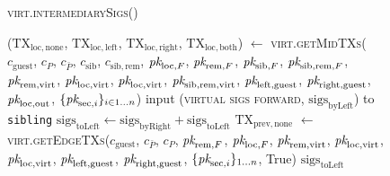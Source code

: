 \begin{figure}[H]
  \begin{processbox}{\textsc{virt.intermediarySigs}()}
    \begin{algorithmic}[1]
      \State ($\mathrm{TX}_{\mathrm{loc}, \mathrm{none}}$,
      $\mathrm{TX}_{\mathrm{loc}, \mathrm{left}}$, $\mathrm{TX}_{\mathrm{loc},
      \mathrm{right}}$, $\mathrm{TX}_{\mathrm{loc}, \mathrm{both}}$) $\gets$
      \textsc{virt.getMidTXs}($c_{\mathrm{guest}}$, $c_P$, $c_{\bar{P}}$,
      $c_{\mathrm{sib}}$, $c_{\mathrm{sib}, \mathrm{rem}}$, $\textit{pk}_{\mathrm{loc},
      F}$, $\textit{pk}_{\mathrm{rem}, F}$, $\textit{pk}_{\mathrm{sib}, F}$, $\textit{pk}_{\mathrm{sib},
      \mathrm{rem}, F}$, $\textit{pk}_{\mathrm{rem}, \mathrm{virt}}$, $\textit{pk}_{\mathrm{loc},
      \mathrm{virt}}$, $\textit{pk}_{\mathrm{loc}, \mathrm{virt}}$, $\textit{pk}_{\mathrm{sib},
      \mathrm{rem}, \mathrm{virt}}$, $\textit{pk}_{\mathrm{left}, \mathrm{guest}}$,
      $\textit{pk}_{\mathrm{right}, \mathrm{guest}}$, $\textit{pk}_{\mathrm{loc}, \mathrm{out}}$,
      $\{\textit{pk}_{\mathrm{sec}, i}\}_{i \in 1 \dots n}$)
      \State {}
      \State input (\textsc{virtual sigs forward},
      $\mathrm{sigs}_{\mathrm{byLeft}}$) to \texttt{sibling}
      \State {}
      \State $\mathrm{sigs}_{\mathrm{toLeft}} \gets
      \mathrm{sigs}_{\mathrm{byRight}} + \mathrm{sigs}_{\mathrm{toLeft}}$
        \State $\mathrm{TX}_{\mathrm{prev}, \mathrm{none}}$ $\gets$
        \textsc{virt.getEdgeTXs}($c_{\mathrm{guest}}$, $c_{\bar{P}}$, $c_P$,
        $\textit{pk}_{\mathrm{rem}, F}$, $\textit{pk}_{\mathrm{loc}, F}$, $\textit{pk}_{\mathrm{rem},
        \mathrm{virt}}$, $\textit{pk}_{\mathrm{loc}, \mathrm{virt}}$, $\textit{pk}_{\mathrm{loc},
        \mathrm{virt}}$, $\textit{pk}_{\mathrm{left}, \mathrm{guest}}$,
        $\textit{pk}_{\mathrm{right}, \mathrm{guest}}$, $\{\textit{pk}_{\mathrm{sec}, i}\}_{1
        \dots n}$, True)
      \EndIf
      \State \Return $\mathrm{sigs}_{\mathrm{toLeft}}$
    \end{algorithmic}
  \end{processbox}
  \caption{}
  \label{code:virtual-layer:intermediary-sigs}
\end{figure}

